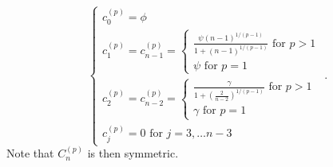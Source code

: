 \documentclass{article}
\begin{document}
\begin{equation*}
	\begin{cases}
		c_{ 0 }^{ \left( p \right) } = \phi \\
		c_{ 1 }^{ \left( p \right) } = c_{ n - 1 }^{ \left( p \right) } =
		\begin{cases}
			\frac{ \psi \left( n - 1 \right)^{ 1 / \left( p - 1 \right) } }{ 1 + \left( n - 1 \right)^{ 1 / \left( p - 1 \right) } } \text{ for } p > 1 \\
			\psi \text{ for } p = 1
		\end{cases} \\
		c_{ 2 }^{ \left( p \right) } = c_{ n - 2 }^{ \left( p \right) } =
		\begin{cases}
			\frac{ \gamma }{ 1 + \left( \frac{ 2 }{ n - 2 } \right)^{ 1 / \left( p - 1 \right) } } \text{ for } p > 1 \\
			\gamma \text{ for } p = 1
		\end{cases} \\
		c_{ j }^{ \left( p \right) } = 0 \text{ for } j = 3, \dots n - 3
	\end{cases}.
\end{equation*}
Note that $ C_{ n }^{ \left( p \right) } $ is then symmetric.
\end{document}
